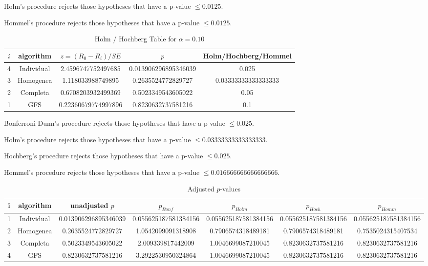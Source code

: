 \documentclass[a4paper,10pt]{article}
\begin{document}
\begin{landscape}
Holm's procedure rejects those hypotheses that have a p-value $\le0.0125$.


Hommel's procedure rejects those hypotheses that have a p-value $\le0.0125$.


\begin{table}[!htp]
\centering\tiny
\caption{Holm / Hochberg Table for $\alpha=0.10$}
\begin{tabular}{ccccc}
$i$&algorithm&$z=(R_0 - R_i)/SE$&$p$&Holm/Hochberg/Hommel\\
\hline
4&Individual&2.4596747752497685&0.013906296895346039&0.025\\
3&Homogenea&1.118033988749895&0.2635524772829727&0.03333333333333333\\
2&Completa&0.6708203932499369&0.5023349543605022&0.05\\
1&GFS&0.22360679774997896&0.8230632737581216&0.1\\
\hline
\end{tabular}
\end{table}
Bonferroni-Dunn's procedure rejects those hypotheses that have a p-value $\le0.025$.


Holm's procedure rejects those hypotheses that have a p-value $\le0.03333333333333333$.


Hochberg's procedure rejects those hypotheses that have a p-value $\le0.025$.


Hommel's procedure rejects those hypotheses that have a p-value $\le0.016666666666666666$.


\begin{table}[!htp]
\centering\tiny
\caption{Adjusted $p$-values}
\begin{tabular}{ccccccc}
i&algorithm&unadjusted $p$&$p_{Bonf}$&$p_{Holm}$&$p_{Hoch}$&$p_{Homm}$\\
\hline
1&Individual&0.013906296895346039&0.055625187581384156&0.055625187581384156&0.055625187581384156&0.055625187581384156\\
2&Homogenea&0.2635524772829727&1.0542099091318908&0.7906574318489181&0.7906574318489181&0.7535024315407534\\
3&Completa&0.5023349543605022&2.009339817442009&1.0046699087210045&0.8230632737581216&0.8230632737581216\\
4&GFS&0.8230632737581216&3.2922530950324864&1.0046699087210045&0.8230632737581216&0.8230632737581216\\
\hline
\end{tabular}
\end{table}


\end{landscape}
\end{document}
